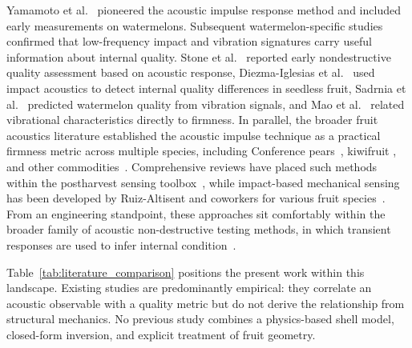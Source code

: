 Yamamoto et al.~\cite{Yamamoto1980} pioneered the acoustic impulse
response method and included early measurements on watermelons.
Subsequent watermelon-specific studies confirmed that low-frequency
impact and vibration signatures carry useful information about internal
quality.  Stone et al.~\cite{Stone1996} reported early nondestructive
quality assessment based on acoustic response, Diezma-Iglesias et
al.~\cite{DiezmaIglesias2004} used impact acoustics to detect internal
quality differences in seedless fruit, Sadrnia et
al.~\cite{Sadrnia2008Vibration} predicted watermelon quality from
vibration signals, and Mao et al.~\cite{Mao2016} related vibrational
characteristics directly to firmness.  In parallel, the broader fruit
acoustics literature established the acoustic impulse technique as a
practical firmness metric across multiple species, including Conference
pears~\cite{Schotte1999, DeBelieetal2000}, kiwifruit
\cite{Terasaki2006}, and other
commodities~\cite{Taniwaki2009, Muramatsu2000, Sakurai2005}.
Comprehensive reviews have placed such methods within the postharvest
sensing toolbox~\cite{Abbott1997, Zude2006, Nicolai2007, GarciaRamos2005},
while impact-based mechanical sensing has been developed
by Ruiz-Altisent and coworkers for various fruit
species~\cite{RuizAltisent1996, Barreiro1998}.
From an engineering standpoint, these approaches sit
comfortably within the broader family of acoustic non-destructive
testing methods, in which transient responses are used to infer internal
condition~\cite{GrosseOhtsu2008}.


Table~\ref{tab:literature_comparison} positions the present work within
this landscape.  Existing studies are predominantly empirical: they
correlate an acoustic observable with a quality metric but do not derive
the relationship from structural mechanics.  No previous study combines
a physics-based shell model, closed-form inversion, and explicit
treatment of fruit geometry.

